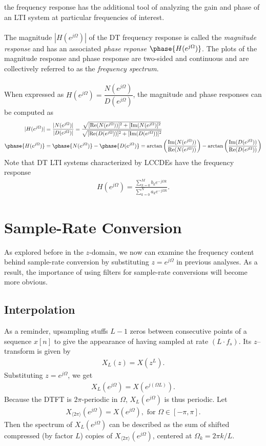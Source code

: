 \documentclass{report}
\begin{document}
the frequency response has the additional tool of analyzing the gain and phase of an LTI system at particular 
frequencies of interest. 
\\ \\
The magnitude $|H(e^{j\Omega})|$ of the DT frequency response is called the \emph{magnitude response} and has an associated \emph{phase reponse} $\phase{H(e^{j\Omega})}$. 
The plots of the magnitude response and phase response are two-sided and continuous and are collectively referred to as the \emph{frequency spectrum}. 
\\ \\ 
When expressed as $H(e^{j\Omega})=\dfrac{N(e^{j\Omega})}{D(e^{j\Omega})}$, the magnitude and phase responses can be computed as 
\begin{align}
    |H(e^{j\Omega})| &= \frac{|N(e^{j\Omega})|}{|D(e^{j\Omega})|} = \frac{\sqrt{[\Re(N(e^{j\Omega}))]^2 + [\Im(N(e^{j\Omega})]^2}}{\sqrt{[\Re(D(e^{j\Omega}))]^2 + [\Im(D(e^{j\Omega}))]^2}} \\
    \phase{H(e^{j\Omega})} &=  \phase{N(e^{j\Omega})} -  \phase{D(e^{j\Omega})} = \arctan\left(\frac{\Im(N(e^{j\Omega}))}{\Re(N(e^{j\Omega}))}\right) - \arctan\left(\frac{\Im(D(e^{j\Omega}))}{\Re(D(e^{j\Omega}))}\right)
\end{align}
Note that DT LTI systems characterized by LCCDEs have the frequency response 
\begin{align}
    H(e^{j\Omega}) = \frac{\displaystyle\sum_{k=0}^{M} b_k e^{-j\Omega k}}{\displaystyle\sum_{k=0}^{N} a_k e^{-j\Omega k}}.
\end{align}

\pagebreak
\section{Sample-Rate Conversion}
As explored before in the $z$-domain, we now can examine the frequency content behind sample-rate conversion by substituting $z=e^{j\Omega}$ in previous analyses. 
As a result, the importance of using filters for sample-rate conversions will become more obvious.

\subsection{Interpolation}
As a reminder, upsampling stuffs $L-1$ zeros between consecutive points of a sequence $x[n]$ to give the appearance of having sampled at rate $(L\cdot f_s)$. Its $z$--transform is 
given by
\begin{align}
    X_L(z) = X(z^L).
\end{align}
Substituting $z=e^{j\Omega}$, we get 
\begin{align}
    X_L(e^{j\Omega}) = X(e^{j(\Omega L)}).
\end{align}
Because the DTFT is $2\pi$-periodic in $\Omega$, $X_L(e^{j\Omega})$ is thus periodic. Let 
\begin{align}
    X_{\langle2\pi\rangle}(e^{j\Omega}) = X(e^{j\Omega}), \text{ for } \Omega\in[-\pi,\pi].
\end{align}
Then the spectrum of $X_L(e^{j\Omega})$ can be described as the sum of shifted 
compressed (by factor $L$) copies of $X_{\langle2\pi\rangle}(e^{j\Omega})$, centered at $\Omega_k = 2\pi k/L$.
\end{document}
